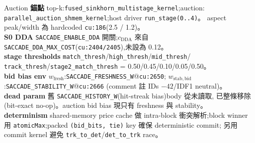 \begin{implsupp}{Auction}
\textbf{錨點}\;\; top-k:\texttt{fused\_sinkhorn\_multistage\_kernel};auction:
\texttt{parallel\_auction\_shmem\_kernel};host driver \texttt{run\_stage(0..4)}。
aspect peak/width 為 hardcoded \texttt{cu:186}(2.5 / 1.2)。\\
\textbf{S0 DDA}\;\; \texttt{SACCADE\_ENABLE\_DDA} 開關;\(c_{\mathrm{DDA}}\) 來自
\texttt{SACCADE\_DDA\_MAX\_COST}(\texttt{cu:2404/2405}),未設為 0.12。\\
\textbf{stage thresholds}\;\; \texttt{match\_thresh}/\texttt{high\_thresh}/\texttt{mid\_thresh}/
\texttt{track\_thresh}/\texttt{stage2\_match\_thresh} = 0.50/0.45/0.10/0.05/0.50。\\
\textbf{bid bias env}\;\; \(w_{\mathrm{fresh}}\):\texttt{SACCADE\_FRESHNESS\_W}@\texttt{cu:2650};
\(w_{\mathrm{stab,bid}}\):\texttt{SACCADE\_STABILITY\_W}@\texttt{cu:2666}
(comment 註 IDs \(-42\)/IDF1 neutral)。\\
\textbf{dead param}\;\; 舊 \texttt{SACCADE\_HISTORY\_W}(hit-streak bias)body 從未讀取,
已整條移除(bit-exact no-op)。auction bid bias 現只有 freshness 與 stability。\\
\textbf{determinism}\;\; shared-memory price cache 做 intra-block 衝突解析;block winner
用 \texttt{atomicMax};packed \texttt{(bid\_bits, tie)} key 確保 deterministic commit;
另用 commit kernel 避免 \texttt{trk\_to\_det}/\texttt{det\_to\_trk} race。
\end{implsupp}
